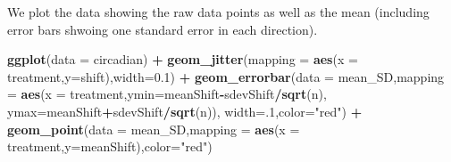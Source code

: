 \documentclass[]{article}
\newenvironment{Shaded}{\begin{snugshade}}{\end{snugshade}}
\newcommand{\DataTypeTok}[1]{\textcolor[rgb]{0.13,0.29,0.53}{#1}}
\newcommand{\DecValTok}[1]{\textcolor[rgb]{0.00,0.00,0.81}{#1}}
\newcommand{\FloatTok}[1]{\textcolor[rgb]{0.00,0.00,0.81}{#1}}
\newcommand{\KeywordTok}[1]{\textcolor[rgb]{0.13,0.29,0.53}{\textbf{#1}}}
\newcommand{\NormalTok}[1]{#1}
\newcommand{\OperatorTok}[1]{\textcolor[rgb]{0.81,0.36,0.00}{\textbf{#1}}}
\newcommand{\StringTok}[1]{\textcolor[rgb]{0.31,0.60,0.02}{#1}}
\begin{document}
\begin{Shaded}
\end{Shaded}

We plot the data showing the raw data points as well as the mean
(including error bars shwoing one standard error in each direction).

\begin{Shaded}
\begin{Highlighting}[]
\KeywordTok{ggplot}\NormalTok{(}\DataTypeTok{data =}\NormalTok{ circadian) }\OperatorTok{+}
\StringTok{  }\KeywordTok{geom_jitter}\NormalTok{(}\DataTypeTok{mapping =} \KeywordTok{aes}\NormalTok{(}\DataTypeTok{x =}\NormalTok{ treatment,}\DataTypeTok{y=}\NormalTok{shift),}\DataTypeTok{width=}\FloatTok{0.1}\NormalTok{) }\OperatorTok{+}\StringTok{ }
\StringTok{  }\KeywordTok{geom_errorbar}\NormalTok{(}\DataTypeTok{data =}\NormalTok{ mean_SD,}\DataTypeTok{mapping =} \KeywordTok{aes}\NormalTok{(}\DataTypeTok{x =}\NormalTok{ treatment,}\DataTypeTok{ymin=}\NormalTok{meanShift}\OperatorTok{-}\NormalTok{sdevShift}\OperatorTok{/}\KeywordTok{sqrt}\NormalTok{(n), }\DataTypeTok{ymax=}\NormalTok{meanShift}\OperatorTok{+}\NormalTok{sdevShift}\OperatorTok{/}\KeywordTok{sqrt}\NormalTok{(n)), }\DataTypeTok{width=}\NormalTok{.}\DecValTok{1}\NormalTok{,}\DataTypeTok{color=}\StringTok{"red"}\NormalTok{) }\OperatorTok{+}\StringTok{ }
\StringTok{  }\KeywordTok{geom_point}\NormalTok{(}\DataTypeTok{data =}\NormalTok{ mean_SD,}\DataTypeTok{mapping =} \KeywordTok{aes}\NormalTok{(}\DataTypeTok{x =}\NormalTok{ treatment,}\DataTypeTok{y=}\NormalTok{meanShift),}\DataTypeTok{color=}\StringTok{"red"}\NormalTok{)}
\end{Highlighting}
\end{Shaded}
\end{document}
